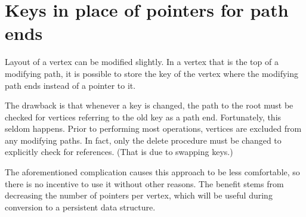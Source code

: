 



\section{Keys in place of pointers for path ends}

Layout of a vertex can be modified slightly. In a vertex that is the top of a modifying path, it is possible to store the key of the vertex where the modifying path ends instead of a pointer to it.

The drawback is that whenever a key is changed, the path to the root must be checked for vertices referring to the old key as a path end. Fortunately, this seldom happens. 
Prior to performing most operations, vertices are excluded from any modifying paths. 
In fact, only the delete procedure must be changed to explicitly check for references. (That is due to swapping keys.)

The aforementioned complication causes this approach to be less comfortable, so there is no incentive to use it without other reasons. 
The benefit stems from decreasing the number of pointers per vertex, which will be useful during conversion to a persistent data structure.
